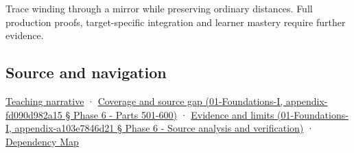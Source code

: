 Trace winding through a mirror while preserving ordinary distances. Full production proofs, target-specific integration and learner mastery require further evidence.

\subsection{Source and navigation}\label{source-and-navigation}

\href{Continuous\%20Notes/Computing\%20Foundations\%20-\%20From\%20Bits\%20to\%20C++\%20and\%20Systems\%20APIs\#Oriented\%20area\%20tells\%20us\%20which\%20side\%20of\%20the\%20panel\%20is\%20front}{Teaching narrative} · \href{}{Coverage and source gap (01-Foundations-I, appendix-fd090d982a15 § Phase 6 - Parts 501-600)} · \href{}{Evidence and limits (01-Foundations-I, appendix-a103e7846d21 § Phase 6 - Source analysis and verification)} · \hyperref[appendix-4ad47bdd269a]{Dependency Map}
